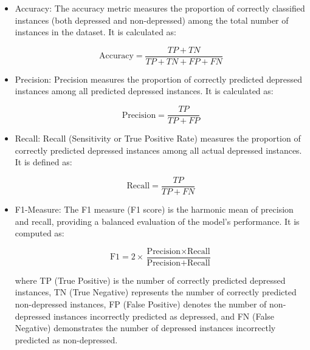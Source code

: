 \begin{itemize}[]
    \item Accuracy: The accuracy metric measures the proportion of correctly classified instances (both depressed and non-depressed) among the total number of instances in the dataset. It is calculated as:

    \begin{equation}
        \text{Accuracy} = \frac{TP + TN}{TP + TN + FP + FN}
    \end{equation}

    \item Precision: Precision measures the proportion of correctly predicted depressed instances among all predicted depressed instances. It is calculated as:

    \begin{equation}
        \text{Precision} = \frac{TP}{TP + FP}
    \end{equation}

    \item Recall: Recall (Sensitivity or True Positive Rate) measures the proportion of correctly predicted depressed instances among all actual depressed instances. It is defined as:

    \begin{equation}
        \text{Recall} = \frac{TP}{TP + FN}
    \end{equation}

    \item F1-Measure: The F1 measure (F1 score) is the harmonic mean of precision and recall, providing a balanced evaluation of the model's performance. It is computed as:

    \begin{equation}
        \text{F1} = 2 \times \frac{\text{Precision} \times \text{Recall}}{\text{Precision} + \text{Recall}}
    \end{equation}

    where TP (True Positive) is the number of correctly predicted depressed instances, TN (True Negative) represents the number of correctly predicted non-depressed instances, FP (False Positive) denotes the number of non-depressed instances incorrectly predicted as depressed, and FN (False Negative) demonstrates the number of depressed instances incorrectly predicted as non-depressed.

\end{itemize}